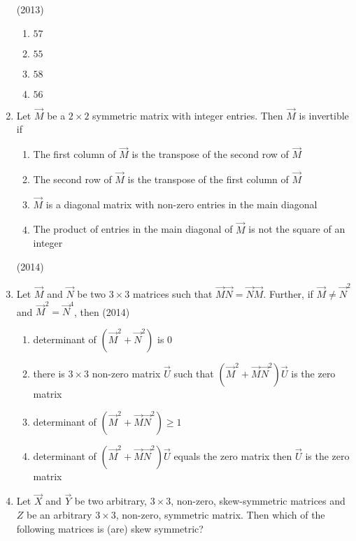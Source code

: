 \begin{enumerate}[label=\thesubsection.\arabic*.,ref=\thesubsection.\theenumi]
        \hfill (2013)
\begin{multicols}{4}
        \begin{enumerate}
            \item $57$
            \item $55$
            \item $58$
            \item $56$
        \end{enumerate}
\end{multicols}
    \item 
        Let $\vec{M}$ be a $2 \times 2$ symmetric matrix with integer entries. Then $\vec{M}$ is invertible if
            \begin{enumerate}
                \item The first column of $\vec{M}$ is the transpose of the second row of $\vec{M}$
                \item The second row of $\vec{M}$ is the transpose of the first column of $\vec{M}$
                \item $\vec{M}$ is a diagonal matrix with non-zero entries in the main diagonal
                \item The product of entries in the main diagonal of $\vec{M}$ is not the square of an integer
            \end{enumerate}
            \hfill (2014)
    \item
        Let $\vec{M}$ and $\vec{N}$ be two $3 \times 3$ matrices such that $\vec{M}\vec{N}=\vec{N}\vec{M}$. Further, if $\vec{M} \neq \vec{N}^2$ and $\vec{M}^2 = \vec{N}^4$, then
            \hfill (2014)
            \begin{enumerate}
                \item determinant of $(\vec{M}^2 + \vec{N}^2)$ is $0$
                \item there is $3 \times 3$ non-zero matrix $\vec{U}$ such that $(\vec{M}^2+\vec{M}\vec{N}^2)\vec{U}$ is the zero matrix
                \item determinant of $(\vec{M}^2 + \vec{M}\vec{N}^2) \geq 1$
                \item determinant of $(\vec{M}^2 + \vec{M}\vec{N}^2)\vec{U}$ equals the zero matrix then $\vec{U}$ is the zero matrix
            \end{enumerate}
    \item
        Let $\vec{X}$ and $\vec{Y}$ be two arbitrary, $3 \times 3$, non-zero, skew-symmetric matrices and $Z$ be an arbitrary $3 \times 3$, non-zero, symmetric matrix. Then which of the following matrices is (are) skew symmetric?

\end{enumerate}
